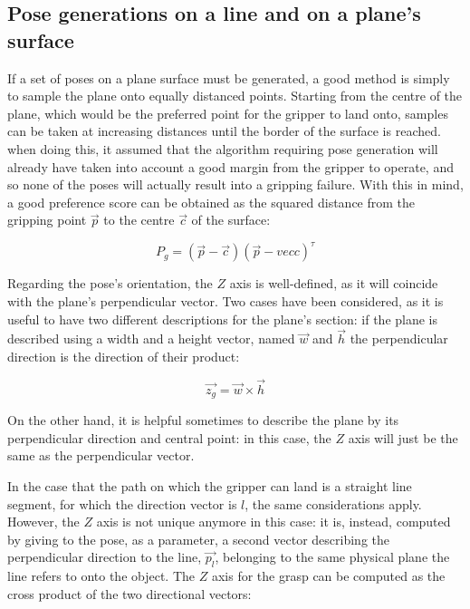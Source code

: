 \subsection{Pose generations on a line and on a plane's surface} \label{sec:pose-generation-line-plane}
If a set of poses on a plane surface must be generated, a good method is simply
to sample the plane onto equally distanced points. Starting from the centre of
the plane, which would be the preferred point for the gripper to land onto,
samples can be taken at increasing distances until the border of the surface is
reached. when doing this, it assumed that the algorithm requiring pose
generation will already have taken into account a good margin from the gripper
to operate, and so none of the poses will actually result into a gripping
failure. With this in mind, a good preference score can be obtained as the
squared distance from the gripping point $\vec{p}$ to the centre $\vec{c}$ of the surface:

\begin{equation}
P_{g}=(\vec{p}-\vec{c})(\vec{p}-vec{c})^\tau
\end{equation}

Regarding the pose's orientation, the $Z$ axis is well-defined, as it will
coincide with the plane's perpendicular vector. Two cases have been considered,
as it is useful to have two different descriptions for the plane's section: if
the plane is described using a width and a height vector, named $\vec{w}$ and $\vec{h}$ the perpendicular
direction is the direction of their product:

\begin{equation}
  \vec{z_{g}}=\vec{w} \times \vec{h}
\end{equation}

On the other hand, it is helpful sometimes to describe the plane by its
perpendicular direction and central point: in this case, the $Z$ axis will just
be the same as the perpendicular vector.

In the case that the path on which the gripper can land is a straight
line segment, for which the direction vector is $l$, the same considerations apply. However, the $Z$ axis is
not unique anymore in this case: it is, instead, computed by giving
to the pose, as a parameter, a second vector describing the
perpendicular direction to the line, $\vec{p_l}$, belonging to the
same physical plane the line refers to onto the object. The $Z$ axis
for the grasp can be computed as the cross product of the two
directional vectors:

